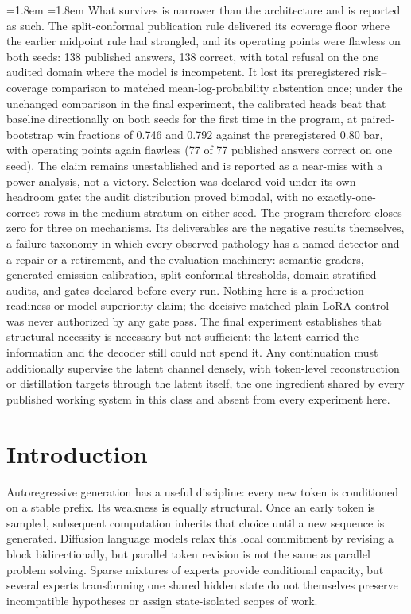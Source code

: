 \documentclass[10pt,a4paper]{article}
\begin{document}
\begin{list}{}{\leftmargin=1.8em \rightmargin=1.8em}
What survives is narrower than the architecture and is reported as such.
The split-conformal publication rule delivered its coverage floor where the
earlier midpoint rule had strangled, and its operating points were flawless
on both seeds: 138 published answers, 138 correct, with total refusal on the
one audited domain where the model is incompetent. It lost its
preregistered risk--coverage comparison to matched mean-log-probability
abstention once; under the unchanged comparison in the final experiment, the
calibrated heads beat that baseline directionally on both seeds for the
first time in the program, at paired-bootstrap win fractions of 0.746 and
0.792 against the preregistered 0.80 bar, with operating points again
flawless (77 of 77 published answers correct on one seed). The claim
remains unestablished and is reported as a near-miss with a power analysis,
not a victory. Selection was declared void under its own
headroom gate: the audit distribution proved bimodal, with no
exactly-one-correct rows in the medium stratum on either seed. The program
therefore closes zero for three on mechanisms. Its deliverables are the
negative results themselves, a failure taxonomy in which every observed
pathology has a named detector and a repair or a retirement, and the
evaluation machinery: semantic graders, generated-emission calibration,
split-conformal thresholds, domain-stratified audits, and gates declared
before every run. Nothing here is a production-readiness or model-superiority
claim; the decisive matched plain-LoRA control was never authorized by any
gate pass. The final experiment establishes that structural necessity is
necessary but not sufficient: the latent carried the
information and the decoder still could not spend it. Any continuation must
additionally supervise the latent channel densely, with token-level
reconstruction or distillation targets through the latent itself, the one
ingredient shared by every published working system in this class and absent
from every experiment here.
\end{list}
\vspace{0.6em}

\section{Introduction}

Autoregressive generation has a useful discipline: every new token is
conditioned on a stable prefix. Its weakness is equally structural. Once an
early token is sampled, subsequent computation inherits that choice until a new
sequence is generated. Diffusion language models relax this local commitment by
revising a block bidirectionally, but parallel token revision is not the same
as parallel problem solving. Sparse mixtures of experts provide conditional
capacity, but several experts transforming one shared hidden state do not
themselves preserve incompatible hypotheses or assign state-isolated scopes of
work.
\end{document}
